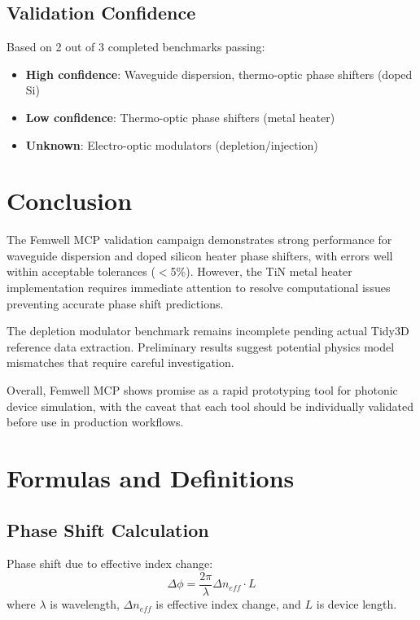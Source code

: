 \documentclass[11pt,a4paper]{article}
\begin{document}
\subsection{Validation Confidence}
Based on 2 out of 3 completed benchmarks passing:
\begin{itemize}
    \item \textbf{High confidence}: Waveguide dispersion, thermo-optic phase shifters (doped Si)
    \item \textbf{Low confidence}: Thermo-optic phase shifters (metal heater)
    \item \textbf{Unknown}: Electro-optic modulators (depletion/injection)
\end{itemize}

\section{Conclusion}

The Femwell MCP validation campaign demonstrates strong performance for waveguide dispersion and doped silicon heater phase shifters, with errors well within acceptable tolerances ($<$5\%). However, the TiN metal heater implementation requires immediate attention to resolve computational issues preventing accurate phase shift predictions.

The depletion modulator benchmark remains incomplete pending actual Tidy3D reference data extraction. Preliminary results suggest potential physics model mismatches that require careful investigation.

Overall, Femwell MCP shows promise as a rapid prototyping tool for photonic device simulation, with the caveat that each tool should be individually validated before use in production workflows.

\appendix
\section{Formulas and Definitions}

\subsection{Phase Shift Calculation}
Phase shift due to effective index change:
\begin{equation}
\Delta\phi = \frac{2\pi}{\lambda} \Delta n_{eff} \cdot L
\end{equation}
where $\lambda$ is wavelength, $\Delta n_{eff}$ is effective index change, and $L$ is device length.
\end{document}
